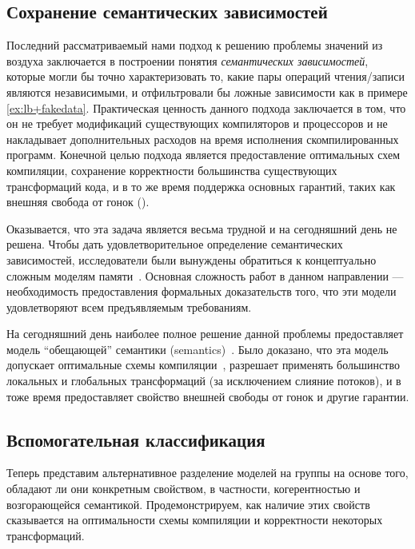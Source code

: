 \subsection{Сохранение семантических зависимостей}
\label{sec:analysis:sdeprf}

Последний рассматриваемый нами подход к решению проблемы значений из воздуха 
заключается в построении понятия \emph{семантических зависимостей}, 
которые могли бы точно характеризовать то, какие пары операций чтения/записи
являются независимыми, и отфильтровали бы ложные зависимости 
как в примере \ref{ex:lb+fakedata}.
Практическая ценность данного подхода заключается в том, что 
он не требует модификаций существующих компиляторов 
и процессоров и не накладывает дополнительных 
расходов на время исполнения скомпилированных программ. 
Конечной целью подхода является предоставление оптимальных схем компиляции, 
сохранение корректности большинства существующих трансформаций кода, 
и в то же время поддержка основных гарантий, 
таких как внешняя свобода от гонок (\eDRF).

Оказывается, что эта задача является весьма трудной 
и на сегодняшний день не решена. 
Чтобы дать удовлетворительное определение семантических зависимостей, 
исследователи были вынуждены  обратиться к концептуально 
сложным моделям памяти~\cite{Jagadeesan-al:ESOP10, Kang-al:POPL17, 
Jeffrey-Riely:LICS16, PichonPharabod-Sewell:POPL16, 
Chakraborty-Vafeiadis:POPL19, Paviotti-al:ESOP20}.
Основная сложность работ в данном направлении --- 
необходимость предоставления формальных доказательств того, 
что эти модели удовлетворяют 
всем предъявляемым требованиям. 

На сегодняшний день наиболее полное решение  данной
проблемы  предоставляет модель  ``обещающей'' семантики 
(\Promising semantics)~\cite{Kang-al:POPL17, Lee-al:PLDI20}. 
Было доказано, что эта модель допускает 
оптимальные схемы компиляции~\cite{Podkopaev-al:POPL19}, 
разрешает применять большинство локальных и глобальных 
трансформаций (за исключением слияние потоков), 
и в тоже время предоставляет 
свойство внешней свободы от гонок и другие гарантии. 

\subsection{Вспомогательная классификация}
\label{sec:analysis:other}

Теперь представим альтернативное разделение моделей на группы  
на основе того, обладают ли они конкретным свойством, 
в частности, когерентностью и возгорающейся семантикой. 
Продемонстрируем, как наличие этих свойств сказывается 
на оптимальности схемы компиляции и корректности некоторых трансформаций. 

